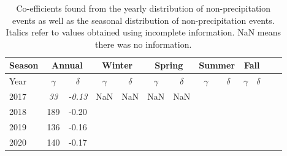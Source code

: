 \begin{table}[htb]
  \begin{center}
    \begin{tabular}{|l|*{11}{c|}r|}
      \hline
      Season    &       \multicolumn{2}{|c|}{Annual}          & \multicolumn{2}{|c|}{Winter}& \multicolumn{2}{|c|}{Spring}  & \multicolumn{2}{|c|}{Summer} &\multicolumn{2}{|c|}{Fall}  \\
      \hline
      Year      & $\gamma $ & $\delta$  & $\gamma $ & $\delta$ & $\gamma $ & $\delta$ & $\gamma $ & $\delta$ & $\gamma $ & $\delta$\\
      \hline
      2017      & \textit{33}  & \textit{-0.13}  & NaN & NaN & NaN & NaN &   &   &   &   \\
      2018      & 189           & -0.20  &  &  &  &  &   &   &  &   \\
      2019      & 136           & -0.16  &  &  &  &  &  &  &  &   \\
      2020      & 140           & -0.17  &  &  &  &  &   &  &  & \\
      \hline
    \end{tabular}
  \end{center}
  \caption[Year comparison of
    coefficients for non-precipitation events]{\label{thirdtable}Co-efficients found from the
    yearly distribution of non-precipitation events as well as the seasonal distribution of non-precipitation events. Italics refer to values obtained
    using incomplete information. NaN means there was no
    information. }
\end{table}